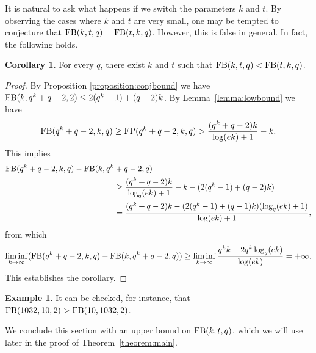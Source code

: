 \documentclass[11pt,a4paper]{article}
\theoremstyle{definition}
\newtheorem{example}[theorem]{Example}
\newtheorem{corollary}[theorem]{Corollary}
\newcommand{\fb}{\textnormal{FB}}
\newcommand{\fp}{\textnormal{FP}}
\begin{document}
It is natural to ask what happens if we switch the parameters $k$ and $t$. 
By observing the cases where $k$ and $t$ are very small, one may be tempted to conjecture that $\fb(k,t,q)=\fb(t,k,q)$. However, this is false in general.
In fact, the following holds.

\begin{corollary}
    For every $q$, there exist $k$ and $t$ such that $\fb(k,t,q)<\fb(t,k,q)$.
\end{corollary}
\begin{proof}
 By Proposition \ref{proposition:conjbound} we have $\fb(k,q^k+q-2,2)\leq 2(q^k-1)+(q-2)k$. By Lemma~\ref{lemma:lowbound} we have
    \begin{equation*}
        \fb(q^k+q-2,k,q)\geq \fp(q^k+q-2,k,q)>\frac{(q^k+q-2)k}{\log(ek)+1}-k.
    \end{equation*}
    This implies
    \begin{equation*}
        \begin{split}
            \fb(q^k+q-2,k,q)-\fb(k,q^k&+q-2,q) \\&\geq\frac{(q^k+q-2)k}{\log_q(ek)+1}-k-(2(q^k-1)+(q-2)k)\\
            &=\frac{(q^k+q-2)k-(2(q^k-1)+(q-1)k)(\log_q(ek)+1)}{\log(ek)+1},
        \end{split}
    \end{equation*}
    from which
    \begin{equation*}
    \liminf_{k\to\infty}(\fb(q^k+q-2,k,q)-\fb(k,q^k+q-2,q))\geq\liminf_{k\to\infty}\frac{q^kk-2q^k\log_q(ek)}{\log(ek)}=+\infty.
    \end{equation*}
    This establishes the corollary.
\end{proof}
\begin{example}  
It can be checked, for instance, that $\fb(1032,10,2)>\fb(10,1032,2)$.
\end{example}

We conclude this section with an upper bound on $\fb(k,t,q)$, which we will use
later in the proof of Theorem~\ref{theorem:main}.
\end{document}
